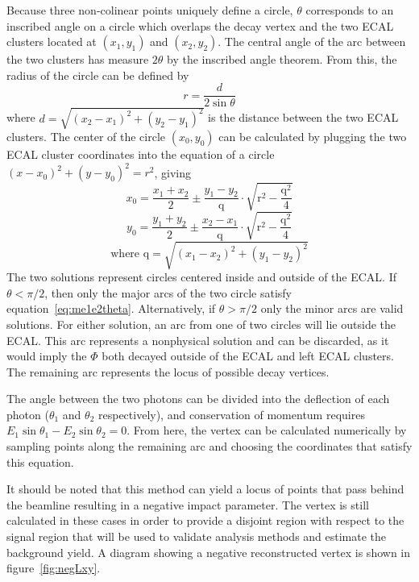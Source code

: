 Because three non-colinear points uniquely define a circle, $\theta$ corresponds to an inscribed angle on a circle which overlaps the decay vertex and the two ECAL clusters located at $(x_1, y_1)$ and $(x_2, y_2)$. The central angle of the arc between the two clusters has measure $2\theta$ by the inscribed angle theorem. From this, the radius of the circle can be defined by
\begin{equation} \label{eq:vertex_r}
	r=\frac{d}{2\sin{\theta}}
\end{equation}
where $d=\sqrt{(x_2-x_1)^2+(y_2-y_1)^2}$ is the distance between the two ECAL clusters. The center of the circle $(x_0, y_0)$ can be calculated by plugging the two ECAL cluster coordinates into the equation of a circle $(x-x_0)^2+(y-y_0)^2=r^2$, giving
\begin{equation} \label{eq:vertex_x0}
	x_0=\frac{x_1+x_2}{2}\pm\frac{y_1-y_2}{\text{q}}\cdot\sqrt{\text{r}^2-\frac{\text{q}^2}{4}}
\end{equation}
\begin{equation} \label{eq:vertex_y0}
	y_0=\frac{y_1+y_2}{2}\pm\frac{x_2-x_1}{\text{q}}\cdot\sqrt{\text{r}^2-\frac{\text{q}^2}{4}}
\end{equation}
\begin{equation} \label{eq:vertex_q}
	\text{where q}=\sqrt{(x_1-x_2)^2+(y_1-y_2)^2}
\end{equation}
The two solutions represent circles centered inside and outside of the ECAL. If $\theta<\pi/2$, then only the major arcs of the two circle satisfy equation~\ref{eq:me1e2theta}. Alternatively, if $\theta>\pi/2$ only the minor arcs are valid solutions. For either solution, an arc from one of two  circles will lie outside the ECAL. This arc represents a nonphysical solution and can be discarded, as it would imply the $\Phi$ both decayed outside of the ECAL and left ECAL clusters. The remaining arc represents the locus of possible decay vertices.

The angle between the two photons can be divided into the deflection of each photon ($\theta_1$ and $\theta_2$ respectively), and conservation of momentum requires $E_1\sin{\theta_1}-E_2\sin{\theta_2}=0$. From here, the vertex can be calculated numerically by sampling points along the remaining arc and choosing the coordinates that satisfy this equation.

It should be noted that this method can yield a locus of points that pass behind the beamline resulting in a negative impact parameter. The vertex is still calculated in these cases in order to provide a disjoint region with respect to the signal region that will be used to validate analysis methods and estimate the background yield. A diagram showing a negative reconstructed vertex is shown in figure~\ref{fig:negLxy}.

